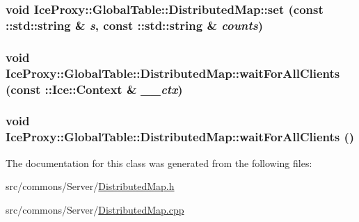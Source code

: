 \hypertarget{class_ice_proxy_1_1_global_table_1_1_distributed_map_a59fbe9ec6ba1b8004941d792cf858c9d}{
\subsubsection[{set}]{\setlength{\rightskip}{0pt plus 5cm}void IceProxy::GlobalTable::DistributedMap::set (const ::std::string \& {\em s}, \/  const ::std::string \& {\em counts})}}
\label{class_ice_proxy_1_1_global_table_1_1_distributed_map_a59fbe9ec6ba1b8004941d792cf858c9d}
\hypertarget{class_ice_proxy_1_1_global_table_1_1_distributed_map_ae0bc0cb4bffe02d4308fdb0730bb7f83}{
\subsubsection[{waitForAllClients}]{\setlength{\rightskip}{0pt plus 5cm}void IceProxy::GlobalTable::DistributedMap::waitForAllClients (const ::Ice::Context \& {\em \_\-\_\-ctx})}}
\label{class_ice_proxy_1_1_global_table_1_1_distributed_map_ae0bc0cb4bffe02d4308fdb0730bb7f83}
\hypertarget{class_ice_proxy_1_1_global_table_1_1_distributed_map_ae1847480af444f5f31c475df4b288b87}{
\subsubsection[{waitForAllClients}]{\setlength{\rightskip}{0pt plus 5cm}void IceProxy::GlobalTable::DistributedMap::waitForAllClients ()}}
\label{class_ice_proxy_1_1_global_table_1_1_distributed_map_ae1847480af444f5f31c475df4b288b87}


The documentation for this class was generated from the following files:\begin{DoxyCompactItemize}
\item 
src/commons/Server/\hyperlink{_distributed_map_8h}{DistributedMap.h}\item 
src/commons/Server/\hyperlink{_distributed_map_8cpp}{DistributedMap.cpp}\end{DoxyCompactItemize}
